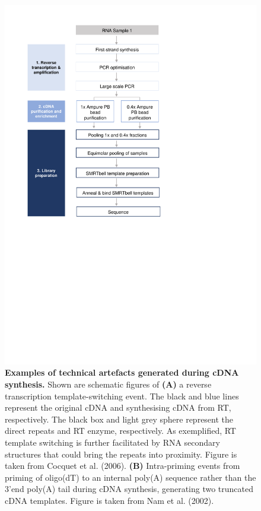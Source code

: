 \begin{figure}[h]
	\begin{center}
		\includegraphics[page=4,trim={2cm 21.5cm 0 1cm},clip, scale = 0.9]{Figures/ProjectDevelopment_Figures.pdf}
	\end{center}
	\captionsetup{width=0.95\textwidth}
	\caption[Examples of technical artefacts generated during cDNA synthesis]%
	{\textbf{Examples of technical artefacts generated during cDNA synthesis.} Shown are schematic figures of \textbf{(A)} a reverse transcription template-switching event. The black and blue lines represent the original cDNA and synthesising cDNA from RT, respectively. The black box and light grey sphere represent the direct repeats and RT enzyme, respectively. As exemplified, RT template switching is further facilitated by RNA secondary structures that could bring the repeats into proximity\cite{Cocquet2006}. Figure is taken from Cocquet et al. (2006)\cite{Cocquet2006}. \textbf{(B)} Intra-priming events from priming of oligo(dT) to an internal poly(A) sequence rather than the 3'end poly(A) tail during cDNA synthesis, generating two truncated cDNA templates. Figure is taken from Nam et al. (2002)\cite{Nam2002}. }
	\label{fig:lib_prep_artifacts}
\end{figure}

